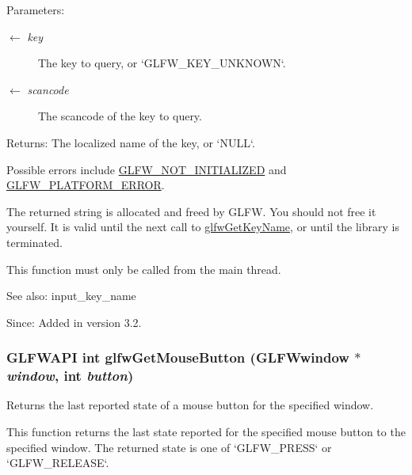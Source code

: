 \begin{Desc}
\item[Parameters:]
\begin{description}
\item[\mbox{$\leftarrow$} {\em key}]The key to query, or `GLFW\_\-KEY\_\-UNKNOWN`. \item[\mbox{$\leftarrow$} {\em scancode}]The scancode of the key to query. \end{description}
\end{Desc}
\begin{Desc}
\item[Returns:]The localized name of the key, or `NULL`.\end{Desc}
Possible errors include \hyperlink{group__errors_g2374ee02c177f12e1fa76ff3ed15e14a}{GLFW\_\-NOT\_\-INITIALIZED} and \hyperlink{group__errors_gd44162d78100ea5e87cdd38426b8c7a1}{GLFW\_\-PLATFORM\_\-ERROR}.

The returned string is allocated and freed by GLFW. You should not free it yourself. It is valid until the next call to \hyperlink{group__input_g9323a397832dd03faa2a88534847c984}{glfwGetKeyName}, or until the library is terminated.

This function must only be called from the main thread.

\begin{Desc}
\item[See also:]input\_\-key\_\-name\end{Desc}
\begin{Desc}
\item[Since:]Added in version 3.2. \end{Desc}
\hypertarget{group__input_g6da5efb04f700c312a57a169fa9393a0}{
\subsubsection[glfwGetMouseButton]{\setlength{\rightskip}{0pt plus 5cm}GLFWAPI int glfwGetMouseButton ({\bf GLFWwindow} $\ast$ {\em window}, \/  int {\em button})}}
\label{group__input_g6da5efb04f700c312a57a169fa9393a0}


Returns the last reported state of a mouse button for the specified window. 

This function returns the last state reported for the specified mouse button to the specified window. The returned state is one of `GLFW\_\-PRESS` or `GLFW\_\-RELEASE`.

